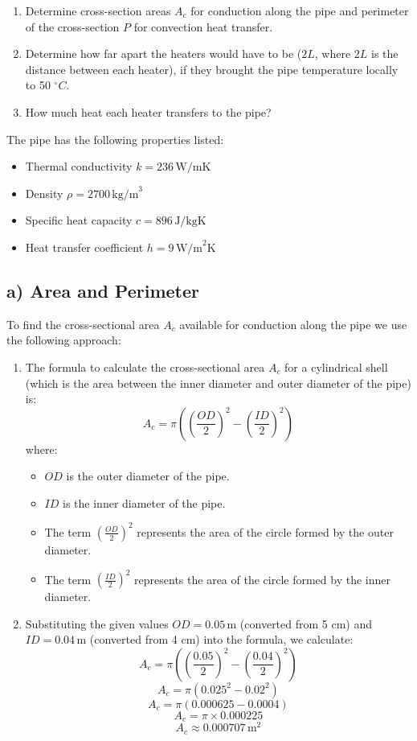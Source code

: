 \documentclass{article}
\begin{document}
\begin{enumerate}
    \item[(a)] Determine cross-section areas \( A_c \) for conduction along the pipe and perimeter of the cross-section \( P \) for convection heat transfer.
    \item[(b)] Determine how far apart the heaters would have to be (\( 2L \), where \( 2L \) is the distance between each heater), if they brought the pipe temperature locally to 50 \( ^\circ C \).
    \item[(c)] How much heat each heater transfers to the pipe?
\end{enumerate}

The pipe has the following properties listed:
\begin{itemize}
    \item Thermal conductivity \( k = 236 \, \text{W/mK} \)
    \item Density \( \rho = 2700 \, \text{kg/m}^3 \)
    \item Specific heat capacity \( c = 896 \, \text{J/kgK} \)
    \item Heat transfer coefficient \( h = 9 \, \text{W/m}^2\text{K} \)
\end{itemize}

\subsection*{a) Area and Perimeter}
To find the cross-sectional area \(A_c\) available for conduction along the pipe we use the following approach:

\begin{enumerate}
    \item The formula to calculate the cross-sectional area \(A_c\) for a cylindrical shell (which is the area between the inner diameter and outer diameter of the pipe) is:
    \[
    A_c = \pi \left(\left(\frac{OD}{2}\right)^2 - \left(\frac{ID}{2}\right)^2\right)
    \]
    where:
    \begin{itemize}
        \item \(OD\) is the outer diameter of the pipe.
        \item \(ID\) is the inner diameter of the pipe.
        \item The term \(\left(\frac{OD}{2}\right)^2\) represents the area of the circle formed by the outer diameter.
        \item The term \(\left(\frac{ID}{2}\right)^2\) represents the area of the circle formed by the inner diameter.
    \end{itemize}

    \item Substituting the given values \(OD = 0.05 \, \text{m}\) (converted from 5 cm) and \(ID = 0.04 \, \text{m}\) (converted from 4 cm) into the formula, we calculate:
    \[
    A_c = \pi \left(\left(\frac{0.05}{2}\right)^2 - \left(\frac{0.04}{2}\right)^2\right)
    \]
    \[
    A_c = \pi \left(0.025^2 - 0.02^2\right)
    \]
    \[
    A_c = \pi \left(0.000625 - 0.0004\right)
    \]
    \[
    A_c = \pi \times 0.000225
    \]
    \[
    A_c \approx 0.000707 \, \text{m}^2
    \]
\end{enumerate}
\end{document}
